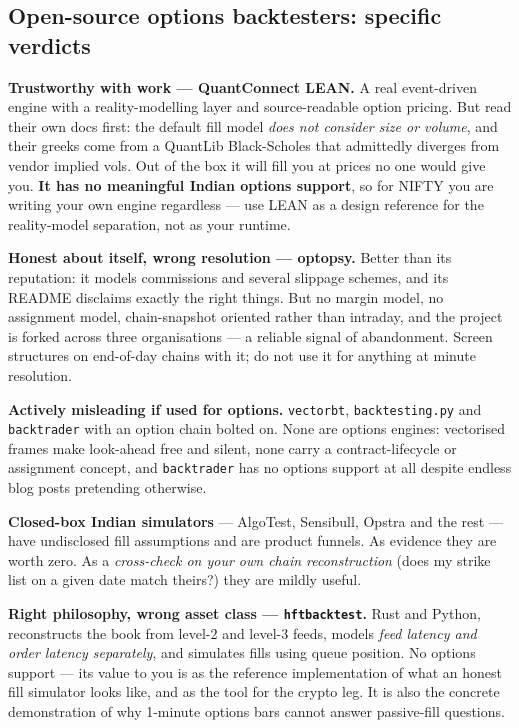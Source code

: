 \documentclass[11pt,a4paper]{article}
\begin{document}
\subsection{Open-source options backtesters: specific verdicts}

\textbf{Trustworthy with work --- QuantConnect LEAN.} A real event-driven engine
with a reality-modelling layer and source-readable option pricing. But read their
own docs first: the default fill model \emph{does not consider size or volume},
and their greeks come from a QuantLib Black-Scholes that admittedly diverges from
vendor implied vols. Out of the box it will fill you at prices no one would give
you. \textbf{It has no meaningful Indian options support}, so for NIFTY you are
writing your own engine regardless --- use LEAN as a design reference for the
reality-model separation, not as your runtime.

\textbf{Honest about itself, wrong resolution --- optopsy.} Better than its
reputation: it models commissions and several slippage schemes, and its README
disclaims exactly the right things. But no margin model, no assignment model,
chain-snapshot oriented rather than intraday, and the project is forked across
three organisations --- a reliable signal of abandonment. Screen structures on
end-of-day chains with it; do not use it for anything at minute resolution.

\textbf{Actively misleading if used for options.} \texttt{vectorbt},
\texttt{backtesting.py} and \texttt{backtrader} with an option chain bolted on.
None are options engines: vectorised frames make look-ahead free and silent, none
carry a contract-lifecycle or assignment concept, and \texttt{backtrader} has no
options support at all despite endless blog posts pretending otherwise.

\textbf{Closed-box Indian simulators} --- AlgoTest, Sensibull, Opstra and the rest
--- have undisclosed fill assumptions and are product funnels. As evidence they
are worth zero. As a \emph{cross-check on your own chain reconstruction} (does my
strike list on a given date match theirs?) they are mildly useful.

\textbf{Right philosophy, wrong asset class --- \texttt{hftbacktest}.} Rust and
Python, reconstructs the book from level-2 and level-3 feeds, models \emph{feed
latency and order latency separately}, and simulates fills using queue position.
No options support --- its value to you is as the reference implementation of what
an honest fill simulator looks like, and as the tool for the crypto leg. It is
also the concrete demonstration of why 1-minute options bars cannot answer
passive-fill questions.
\end{document}
